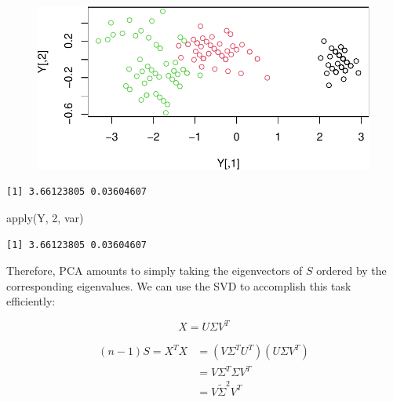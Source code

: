 \documentclass[
  letterpaper,
  DIV=11,
  numbers=noendperiod]{scrreprt}
\newenvironment{Shaded}{\begin{snugshade}}{\end{snugshade}}
\newcommand{\DecValTok}[1]{\textcolor[rgb]{0.68,0.00,0.00}{#1}}
\newcommand{\FunctionTok}[1]{\textcolor[rgb]{0.28,0.35,0.67}{#1}}
\newcommand{\NormalTok}[1]{\textcolor[rgb]{0.00,0.23,0.31}{#1}}
\newcommand{\SpecialCharTok}[1]{\textcolor[rgb]{0.37,0.37,0.37}{#1}}
\begin{document}
\begin{figure}[H]

{\centering \includegraphics{./11-SVD_PCA_files/figure-pdf/unnamed-chunk-8-1.pdf}

}

\end{figure}

\begin{Shaded}
\end{Shaded}

\begin{verbatim}
[1] 3.66123805 0.03604607
\end{verbatim}

\begin{Shaded}
\begin{Highlighting}[]
\FunctionTok{apply}\NormalTok{(Y, }\DecValTok{2}\NormalTok{, var)}
\end{Highlighting}
\end{Shaded}

\begin{verbatim}
[1] 3.66123805 0.03604607
\end{verbatim}

Therefore, PCA amounts to simply taking the eigenvectors of \(S\)
ordered by the corresponding eigenvalues. We can use the SVD to
accomplish this task efficiently:

\[
X = U \Sigma V^T
\]

\[
\begin{aligned}
(n-1) S = X^T X &= (V \Sigma^T U^T) (U \Sigma V^T)\\
&= V \Sigma^T \Sigma V^T\\
&= V \widetilde{\Sigma}^2 V^T
\end{aligned}
\]
\end{document}
